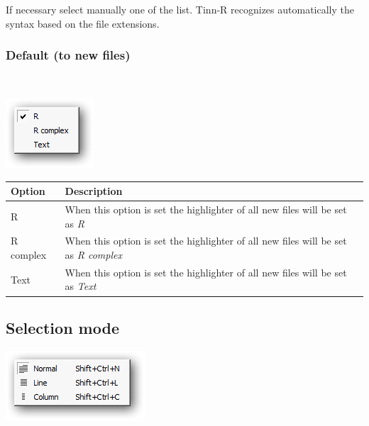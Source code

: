 If necessary select manually one of the list. Tinn-R recognizes
automatically the syntax based on the file extensions.


\hypertarget{menu_options_syntax_default}{}
\subsubsection{Default (to new files)}\\

\includegraphics[scale=0.50]{./res/menu_options_syntax_default.png}\\

\begin{scriptsize}\begin{tabularx}{\textwidth}{>{\hsize=0.2\hsize}X>{\hsize=0.8\hsize}X}\\
    \hline
    \textbf{Option} & \textbf{Description} \\
    \hline
    R & When this option is set the highlighter of all new files will be set as \textit{R} \\
    R complex & When this option is set the highlighter of all new files will be set as \textit{R complex} \\
    Text & When this option is set the highlighter of all new files will be set as \textit{Text} \\
    \hline
  \end{tabularx}\end{scriptsize}


\hypertarget{menu_options_selectionmode}{}
\subsection{Selection mode}

\includegraphics[scale=0.50]{./res/menu_options_selectionmode.png}\\

